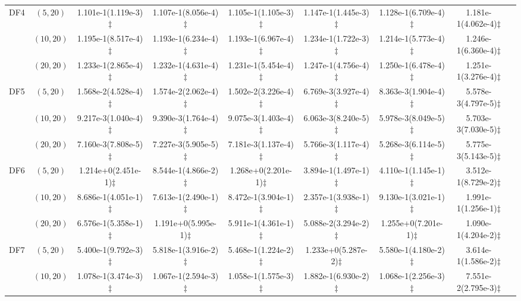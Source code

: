 \documentclass[review]{elsarticle}
\begin{document}
\begin{table*}[!tbh]
{{\begin{tabular} {ccccccccc}
\hline  \multirow{3}{*}{DF4}
&$(5,20)$ &1.101e-1(1.119e-3)$\ddagger$ &1.107e-1(8.056e-4)$\ddagger$ &1.105e-1(1.105e-3)$\ddagger$ &1.147e-1(1.445e-3)$\ddagger$ &1.128e-1(6.709e-4)$\ddagger$ &1.181e-1(4.062e-4)$\ddagger$ \\
&$(10,20)$ &1.195e-1(8.517e-4)$\ddagger$ &1.193e-1(6.234e-4)$\ddagger$ &1.193e-1(6.967e-4)$\ddagger$ &1.234e-1(1.722e-3)$\ddagger$ &1.214e-1(5.773e-4)$\ddagger$ &1.246e-1(6.360e-4)$\ddagger$ \\
&$(20,20)$ &1.233e-1(2.865e-4)$\ddagger$ &1.232e-1(4.631e-4)$\ddagger$ &1.231e-1(5.454e-4)$\ddagger$ &1.247e-1(4.756e-4)$\ddagger$ &1.250e-1(6.478e-4)$\ddagger$ &1.251e-1(3.276e-4)$\ddagger$ \\
\hline  \multirow{3}{*}{DF5}
&$(5,20)$ &1.568e-2(4.528e-4)$\ddagger$ &1.574e-2(2.062e-4)$\ddagger$ &1.502e-2(3.226e-4)$\ddagger$ &6.769e-3(3.927e-4)$\ddagger$ &8.363e-3(1.904e-4)$\ddagger$ &5.578e-3(4.797e-5)$\ddagger$ \\
&$(10,20)$ &9.217e-3(1.040e-4)$\ddagger$ &9.390e-3(1.764e-4)$\ddagger$ &9.075e-3(1.403e-4)$\ddagger$ &6.063e-3(8.240e-5)$\ddagger$ &5.978e-3(8.049e-5)$\ddagger$ &5.703e-3(7.030e-5)$\ddagger$ \\
&$(20,20)$ &7.160e-3(7.808e-5)$\ddagger$ &7.227e-3(5.905e-5)$\ddagger$ &7.181e-3(1.137e-4)$\ddagger$ &5.766e-3(1.117e-4)$\ddagger$ &5.268e-3(6.114e-5)$\ddagger$ &5.775e-3(5.143e-5)$\ddagger$ \\
\hline  \multirow{3}{*}{DF6}
&$(5,20)$ &1.214e+0(2.451e-1)$\ddagger$ &8.544e-1(4.866e-2)$\ddagger$ &1.268e+0(2.201e-1)$\ddagger$ &3.894e-1(1.497e-1)$\ddagger$ &4.110e-1(1.145e-1)$\ddagger$ &3.512e-1(8.729e-2)$\ddagger$ \\
&$(10,20)$ &8.686e-1(4.051e-1)$\ddagger$ &7.613e-1(2.490e-1)$\ddagger$ &8.472e-1(3.904e-1)$\ddagger$ &2.357e-1(3.938e-1)$\ddagger$ &9.130e-1(3.021e-1)$\ddagger$ &1.991e-1(1.256e-1)$\ddagger$ \\
&$(20,20)$ &6.576e-1(5.358e-1)$\ddagger$ &1.191e+0(5.995e-1)$\ddagger$ &5.911e-1(4.361e-1)$\ddagger$ &5.088e-2(3.294e-2)$\ddagger$ &1.255e+0(7.201e-1)$\ddagger$ &1.090e-1(4.204e-2)$\ddagger$ \\
\hline  \multirow{3}{*}{DF7}
&$(5,20)$ &5.400e-1(9.792e-3)$\ddagger$ &5.818e-1(3.916e-2)$\ddagger$ &5.468e-1(1.224e-2)$\ddagger$ &1.233e+0(5.287e-2)$\ddagger$ &5.580e-1(4.180e-2)$\ddagger$ &3.614e-1(1.586e-2)$\ddagger$ \\
&$(10,20)$ &1.078e-1(3.474e-3)$\ddagger$ &1.067e-1(2.594e-3)$\ddagger$ &1.058e-1(1.575e-3)$\ddagger$ &1.882e-1(6.930e-2)$\ddagger$ &1.068e-1(2.256e-3)$\ddagger$ &7.551e-2(2.795e-3)$\ddagger$ \\

\end{tabular}}}
\end{table*}
\end{document}
